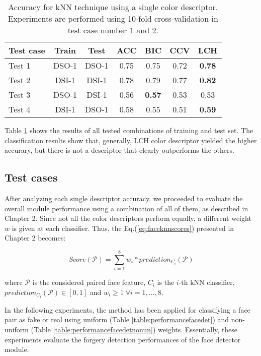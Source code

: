 \begin{table}[h!]
\centering
\begin{tabular}{l c c c c c c} 
\hline \hline 
\textbf{Test case} & \textbf{Train} & \textbf{Test} & \textbf{ACC} & \textbf{BIC} & \textbf{CCV} & \textbf{LCH} \\ [0.5ex]
\hline
Test 1 & DSO-1 & DSO-1 &	0.75 & 0.75	& 0.72 & \textbf{0.78}\\
Test 2 & DSI-1 & DSI-1 &	0.78 & 0.79 & 0.77 & \textbf{0.82}\\
Test 3 &	DSO-1 &	DSI-1 &	0.56 & \textbf{0.57} & 0.53 & 0.53\\
Test 4 &	DSI-1 & DSO-1 & 0.58 & 0.55 & 0.51 & \textbf{0.59}\\ [1ex]
\hline
\end{tabular}
\caption{Accuracy for kNN technique using a single color descriptor. Experiments are performed using 10-fold cross-validation in test case number 1 and 2.}
\label{table:colordescriptorperformance}
\end{table}

Table \ref{table:colordescriptorperformance} shows the results of all tested combinations of training and test set. The classification results show that, generally, LCH color descriptor yielded the higher accurary, but there is not a descriptor that clearly outperforms the others.

\subsection{Test cases}

After analyzing each single descriptor accuracy, we proceeded to evaluate the overall module performance using a combination of all of them, as described in Chapter 2. Since not all the color descriptors perform equally, a different weight $w$ is given at each classifier. Thus, the Eq.(\ref{eq:faceknnscores}) presented in Chapter 2 becomes:

\begin{equation}
Score(\mathcal{P}) = \sum_{i = 1}^{8} w_i * prediction_{C_i}(\mathcal{P})
\end{equation}

where $\mathcal{P}$ is the considered paired face feature, $C_i$ is the $i$-th kNN classifier, $prediction_{C_i}(\mathcal{P}) \in [0, 1]$ and $w_i \geq 1 \; \forall i = 1, \ldots, 8$.

In the following experiments, the  method has been applied for classifying a face pair as fake or real using uniform (Table \ref{table:performancefacedet}) and non-uniform (Table \ref{table:performancefacedetnonun}) weights. Essentially, these experiments evaluate the forgery detection performances of the face detector module.

